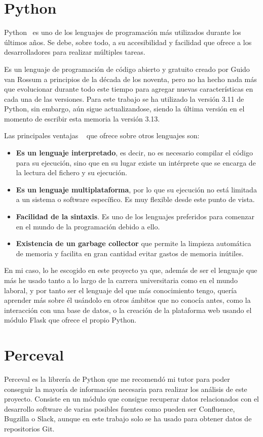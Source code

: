 \documentclass[a4paper, 12pt]{book}
\begin{document}
\section{Python}
 \label{sec:Python}

Python~\cite{python:_python} es uno de los lenguajes de programación más utilizados durante los últimos años. Se debe, sobre todo, a su accesibilidad y facilidad que ofrece a los desarrolladores para realizar múltiples tareas. 

Es un lenguaje de programación de código abierto y gratuito creado por Guido van Rossum a principios de la década de los noventa, pero no ha hecho nada más que evolucionar durante todo este tiempo para agregar nuevas características en cada una de las versiones. Para este trabajo se ha utilizado la versión 3.11 de Python, sin embargo, aún sigue actualizandose, siendo la última versión en el momento de escribir esta memoria la versión 3.13. 

Las principales ventajas ~\cite{fernandez:_python} que ofrece sobre otros lenguajes son:

\begin{itemize}
  \item \textbf{Es un lenguaje interpretado}, es decir, no es necesario compilar el código para su ejecución, sino que en su lugar existe un intérprete que se encarga de la lectura del fichero y su ejecución.
  \item \textbf{Es un lenguaje multiplataforma}, por lo que su ejecución no está limitada a un sistema o software específico. Es muy flexible desde este punto de vista.
  \item \textbf{Facilidad de la sintaxis}. Es uno de los lenguajes preferidos para comenzar en el mundo de la programación debido a ello.
  \item \textbf{Existencia de un garbage collector} que permite la limpieza automática de memoria y facilita en gran cantidad evitar gastos de memoria inútiles.
\end{itemize}

En mi caso, lo he escogido en este proyecto ya que, además de ser el lenguaje que más he usado tanto a lo largo de la carrera universitaria como en el mundo laboral, y por tanto ser el lenguaje del que más conocimiento tengo, quería aprender más sobre él usándolo en otros ámbitos que no conocía antes, como la interacción con una base de datos, o la creación de la plataforma web usando el módulo Flask que ofrece el propio Python.

\section{Perceval}
\label{sec:Perceval}
Perceval es la librería de Python que me recomendó mi tutor para poder conseguir la mayoría de información necesaria para realizar los análisis de este proyecto. Consiste en un módulo que consigue recuperar datos relacionados con el desarrollo software de varias posibles fuentes como pueden ser Confluence, Bugzilla o Slack, aunque en este trabajo solo se ha usado para obtener datos de repositorios Git.
\end{document}
